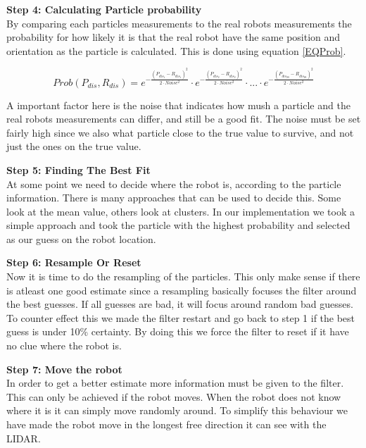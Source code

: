 \textbf{Step 4: Calculating Particle probability}\\

By comparing each particles measurements to the real robots measurements the probability for how likely it is that the real robot have the same position and orientation as the particle is calculated. This is done using equation \ref{EQProb}. 

\begin{equation}
	Prob(P_{dis},R_{dis})= e^{-{\frac{(P_{dis_1} - R_{dis_1})^2}{2 \cdot Noise^2}}} \cdot e^{-{\frac{(P_{dis_2} - R_{dis_2})^2}{2 \cdot Noise^2}}} \cdot ... \cdot e^{-{\frac{(P_{dis_{20}} - R_{dis_{20}})^2}{2 \cdot Noise^2}}}
\label{EQProb}
\end{equation}

A important factor here is the noise that indicates how mush a particle and the real robots measurements can differ, and still be a good fit. The noise must be set fairly high since we also what particle close to the true value to survive, and not just the ones on the true value. 

\textbf{Step 5: Finding The Best Fit}\\
At some point we need to decide where the robot is, according to the particle information. There is many approaches that can be used to decide this. Some look at the mean value, others look at clusters. In our implementation we took a simple approach and took the particle with the highest probability and selected as our guess on the robot location. 

\textbf{Step 6: Resample Or Reset}\\
Now it is time to do the resampling of the particles. This only make sense if there is atleast one good estimate since a resampling basically focuses the filter around the best guesses. If all guesses are bad, it will focus around random bad guesses. To counter effect this we made the filter restart and go back to step 1 if the best guess is under 10\% certainty. By doing this we force the filter to reset if it have no clue where the robot is. 

\textbf{Step 7: Move the robot}\\
In order to get a better estimate more information must be given to the filter. This can only be achieved if the robot moves. When the robot does not know where it is it can simply move randomly around. To simplify this behaviour we have made the robot move in the longest free direction it can see with the LIDAR. 

